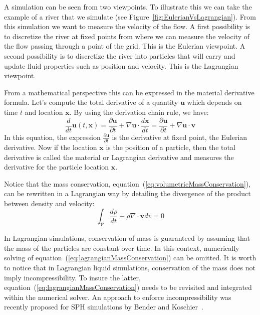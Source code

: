 A simulation can be seen from two viewpoints. To illustrate this we can take the example of a river that we simulate (see Figure~\ref{fig:EulerianVsLagrangian}). From this simulation we want to measure the velocity of the flow. A first possibility is to discretize the river at fixed points from where we can measure the velocity of the flow passing through a point of the grid. This is the Eulerian viewpoint.
A second possibility is to discretize the river into particles that will carry and update fluid properties such as position and velocity. This is the Lagrangian viewpoint. 

From a mathematical perspective this can be expressed in the material derivative formula. Let's compute the total derivative of a quantity $\mathbf{u}$ which depends on time $t$ and location $\mathbf{x}$. By using the derivation chain rule, we have:
\begin{equation}
\frac{d}{dt}\mathbf{u}(t,\mathbf{x}) = 
\frac{\partial \mathbf{u}}{\partial t} + \nabla \mathbf{u} \cdot \frac{d\mathbf{x}}{dt} =
\frac{\partial \mathbf{u}}{\partial t} + \nabla \mathbf{u} \cdot \mathbf{v} 
\end{equation}
In this equation, the expression $\frac{\partial \mathbf{u}}{\partial t}$ is the derivative at fixed point, the Eulerian derivative. Now if the location $\mathbf{x}$ is the position of a particle, then the total derivative is called the material or Lagrangian derivative and measures the derivative for the particle location $\mathbf{x}$.

Notice that the mass conservation, equation~(\ref{eq:volumetricMassConservation}), can be rewritten in a Lagrangian way by detailing the divergence of the product between density and velocity:
\begin{equation}
\label{eq:lagrangianMassConservation}
\int_{\mathcal{V}} \frac{d\rho}{dt} + \rho \nabla \cdot \mathbf{v} dv = 0
\end{equation}

In Lagrangian simulations, conservation of mass is guaranteed by assuming that the mass of the particles are constant over time. In this context, numerically solving of equation~(\ref{eq:lagrangianMassConservation}) can be omitted. It is worth to notice that in Lagrangian liquid simulations, conservation of the mass does not imply incompressibility. To insure the latter, equation~(\ref{eq:lagrangianMassConservation}) needs to be revisited and integrated within the numerical solver. An approach to enforce incompressibility was recently proposed for SPH simulations by Bender and Koschier~\cite{Bender2015}.

